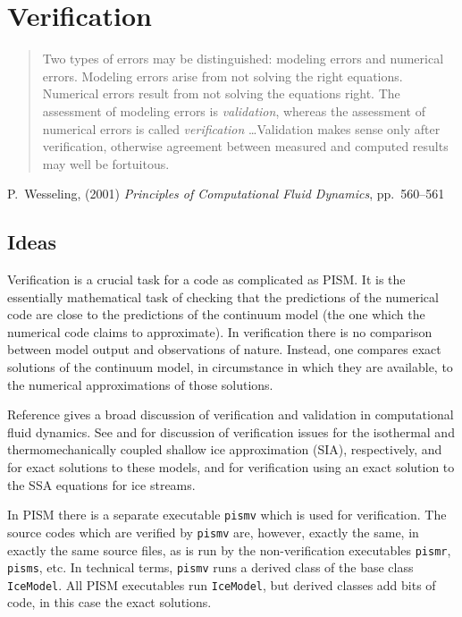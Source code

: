 
\section{Verification}\label{sect:verif}

\bigskip
\begin{quote}  Two types of errors may be distinguished: modeling errors and numerical errors.  Modeling errors arise from not solving the right equations.  Numerical errors result from not solving the equations right.  The assessment of modeling errors is \emph{validation}, whereas the assessment of numerical errors is called \emph{verification} \dots  Validation makes sense only after verification, otherwise agreement between measured and computed results may well be fortuitous.
\end{quote}
\hfill P.~Wesseling, (2001)  \emph{Principles of Computational Fluid Dynamics}, pp.~560--561 \cite{Wesseling}
\bigskip

\subsection{Ideas}  Verification is a crucial task for a code as complicated as PISM.  It is the essentially mathematical task of checking that the predictions of the numerical code are close to the predictions of the continuum model (the one which the numerical code claims to approximate).  In verification there is no comparison between model output and observations of nature.  Instead, one compares exact solutions of the continuum model, in circumstance in which they are available, to the numerical approximations of those solutions.

Reference \cite{Roache} gives a broad discussion of verification and validation in computational fluid dynamics. See \cite{BLKCB} and \cite{BBL} for discussion of verification issues for the isothermal and thermomechanically coupled shallow ice approximation (SIA), respectively, and for exact solutions to these models, and \cite{BBssasliding,SchoofStream} for verification using an exact solution to the SSA equations for ice streams.  

In PISM there is a separate executable \texttt{pismv} which is used for
verification.  The source codes which are verified by \texttt{pismv} are,
however, exactly the same, in exactly the same source files, as is run by the
non-verification executables \texttt{pismr}, \texttt{pisms}, etc.  In technical terms, \texttt{pismv} runs a derived class of the base class \texttt{IceModel}.  All PISM executables run \texttt{IceModel}, but derived classes add bits of code, in this case the exact solutions.

